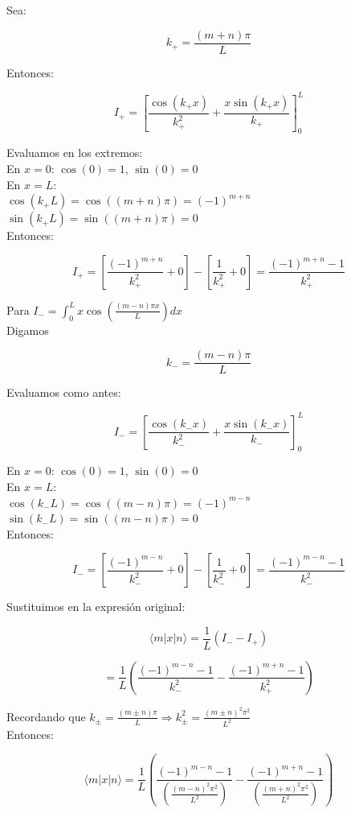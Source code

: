 \documentclass{article}
\theoremstyle{nonumberplain}
\begin{document}
Sea:

$$
k_+ = \frac{(m + n)\pi}{L}
$$

Entonces:

$$
I_{+} = \left[ \frac{\cos(k_+ x)}{k_+^2} + \frac{x \sin(k_+ x)}{k_+} \right]_0^L
$$

Evaluamos en los extremos: \\
En $x = 0$: $\cos(0) = 1$, $\sin(0) = 0$ \\
En $x = L$: \\
  $\cos(k_+ L) = \cos((m+n)\pi) = (-1)^{m+n}$ \\
  $\sin(k_+ L) = \sin((m+n)\pi) = 0$ \\

Entonces:

$$
I_{+} = \left[ \frac{(-1)^{m+n}}{k_+^2} + 0 \right] - \left[ \frac{1}{k_+^2} + 0 \right] = \frac{(-1)^{m+n} - 1}{k_+^2}
$$

Para $I_{-} = \int_0^L x \cos\left( \frac{(m - n)\pi x}{L} \right) dx$ \\

Digamos

$$
k_- = \frac{(m - n)\pi}{L}
$$

Evaluamos como antes:

$$
I_{-} = \left[ \frac{\cos(k_- x)}{k_-^2} + \frac{x \sin(k_- x)}{k_-} \right]_0^L
$$

En $x = 0$: $\cos(0) = 1$, $\sin(0) = 0$ \\
En $x = L$: \\
$\cos(k_- L) = \cos((m - n)\pi) = (-1)^{m-n}$ \\
$\sin(k_- L) = \sin((m - n)\pi) = 0$ \\

Entonces:

$$
I_{-} = \left[ \frac{(-1)^{m-n}}{k_-^2} + 0 \right] - \left[ \frac{1}{k_-^2} + 0 \right] = \frac{(-1)^{m-n} - 1}{k_-^2}
$$

Sustituimos en la expresión original:

$$
\langle m | x | n \rangle = \frac{1}{L} \left( I_{-} - I_{+} \right)
$$

$$
= \frac{1}{L} \left( \frac{(-1)^{m-n} - 1}{k_-^2} - \frac{(-1)^{m+n} - 1}{k_+^2} \right)
$$

Recordando que $k_{\pm} = \frac{(m \pm n)\pi}{L} \Rightarrow k_{\pm}^2 = \frac{(m \pm n)^2 \pi^2}{L^2}$ \\

Entonces:

$$
\langle m | x | n \rangle = \frac{1}{L} \left( \frac{(-1)^{m-n} - 1}{\left( \frac{(m - n)^2 \pi^2}{L^2} \right)} - \frac{(-1)^{m+n} - 1}{\left( \frac{(m + n)^2 \pi^2}{L^2} \right)} \right)
$$
\end{document}
